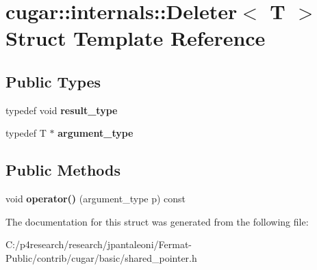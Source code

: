 \hypertarget{structcugar_1_1internals_1_1_deleter}{}\section{cugar\+:\+:internals\+:\+:Deleter$<$ T $>$ Struct Template Reference}
\label{structcugar_1_1internals_1_1_deleter}
\subsection*{Public Types}
\begin{DoxyCompactItemize}
\item 
\mbox{\label{structcugar_1_1internals_1_1_deleter_a203a2c8fc188907452beedb4e8023023}} 
typedef void {\bfseries result\+\_\+type}
\item 
\mbox{\label{structcugar_1_1internals_1_1_deleter_af745d67391e1ceb17945c96cd2bc0461}} 
typedef T $\ast$ {\bfseries argument\+\_\+type}
\end{DoxyCompactItemize}
\subsection*{Public Methods}
\begin{DoxyCompactItemize}
\item 
\mbox{\label{structcugar_1_1internals_1_1_deleter_ad9c1c23409fcdacd93d81fec6a148153}} 
void {\bfseries operator()} (argument\+\_\+type p) const
\end{DoxyCompactItemize}


The documentation for this struct was generated from the following file\+:\begin{DoxyCompactItemize}
\item 
C\+:/p4research/research/jpantaleoni/\+Fermat-\/\+Public/contrib/cugar/basic/shared\+\_\+pointer.\+h\end{DoxyCompactItemize}
